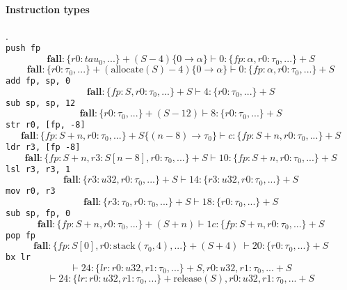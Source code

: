 \documentclass{article}
\begin{document}
\paragraph{Instruction types}
.\\
\texttt{push fp}
\[\mathbf{fall} : \{r0 : tau_0, ...\}+(S-4)\{0 \rightarrow \alpha\} \vdash 0: \{fp : \alpha, r0 : \tau_0, ...\}+S\]
\[\mathbf{fall} : \{r0 : \tau_0, ...\}+(\mathrm{allocate}(S)-4)\{0 \rightarrow \alpha\} \vdash 0: \{fp : \alpha, r0 : \tau_0, ...\}+S\]
\texttt{add fp, sp, 0}
\[\mathbf{fall} : \{fp : S, r0 : \tau_0, ...\}+S \vdash 4: \{r0 : \tau_0, ...\}+S\]
\texttt{sub sp, sp, 12}
\[\mathbf{fall} : \{r0 : \tau_0, ...\}+(S-12) \vdash 8: \{r0 : \tau_0, ...\}+S\]
\texttt{str r0, [fp, -8]}
\[\mathbf{fall} : \{fp : S + n, r0 : \tau_0, ...\}+S\{(n - 8)\rightarrow \tau_0\} \vdash c: \{fp : S + n, r0 : \tau_0, ...\}+S\]
\texttt{ldr r3, [fp -8]}
\[\mathbf{fall} : \{fp : S + n, r3 : S[n - 8], r0 : \tau_0, ...\}+S \vdash 10: \{fp : S + n, r0 : \tau_0, ...\}+S\]
\texttt{lsl r3, r3, 1}
\[\mathbf{fall} : \{r3 : u32, r0 : \tau_0, ...\}+S \vdash 14 : \{r3 : u32, r0 : \tau_0, ...\}+S\]
\texttt{mov r0, r3}
\[\mathbf{fall} : \{r3 : \tau_0, r0 : \tau_0, ...\}+S \vdash 18 : \{r0 : \tau_0, ...\}+S\]
\texttt{sub sp, fp, 0}
\[\mathbf{fall} : \{fp : S + n, r0 : \tau_0, ...\}+(S+n) \vdash 1c : \{fp : S + n, r0 : \tau_0, ...\}+S\]
\texttt{pop fp}
\[\mathbf{fall} : \{fp : S[0], r0 : \mathrm{stack}(\tau_0, 4), ...\}+(S+4)\ \vdash 20: \{r0 : \tau_0, ...\}+S\]
\texttt{bx lr}
\[\vdash 24: \{lr : {r0 : u32, r1 : \tau_0, ...\}+S, r0 : u32, r1 : \tau_0, ...}+S\]
\[\vdash 24: \{lr : {r0 : u32, r1 : \tau_0, ...\}+\mathrm{release}(S), r0 : u32, r1 : \tau_0, ...}+S\]
\end{document}
